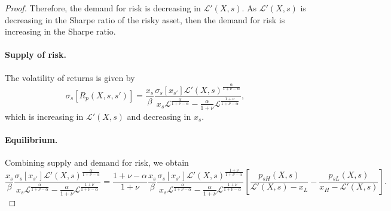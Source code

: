 \begin{proof}
Therefore, the demand for risk is decreasing in $\mathcal{L}'(X,s)$. 
As $\mathcal{L}'(X,s)$ is decreasing in the Sharpe ratio of the risky asset, then the demand for risk is increasing in the Sharpe ratio.

\paragraph{Supply of risk.} The volatility of returns is given by
\begin{equation}
    \sigma_s[R_p(X,s,s')] = \frac{x_s}{\beta} \frac{\sigma_s[x_{s'}] \mathcal{L}'(X,s)^\frac{\alpha}{1+\nu-\alpha}}{x_{s} \mathcal{L}^\frac{\alpha}{1+\nu-\alpha} - \frac{\alpha}{1+\nu} \mathcal{L}^{\frac{1+\nu}{1+\nu-\alpha}} },
\end{equation}
which is increasing in $\mathcal{L}'(X,s)$ and decreasing in $x_s$. 


\paragraph{Equilibrium.} Combining supply and demand for risk, we obtain\small
\begin{equation}
 \frac{x_s}{\beta} \frac{\sigma_s[x_{s'}] \mathcal{L}'(X,s)^\frac{\alpha}{1+\nu-\alpha}}{x_{s} \mathcal{L}^\frac{\alpha}{1+\nu-\alpha} - \frac{\alpha}{1+\nu} \mathcal{L}^{\frac{1+\nu}{1+\nu-\alpha}} } =  
 \frac{1+\nu-\alpha}{1+\nu}\frac{x_s}{\beta} \frac{\sigma_s[x_{s'}]\mathcal{L}'(X,s)^{\frac{1+\nu}{1+\nu-\alpha}}}{x_{s} \mathcal{L}^\frac{\alpha}{1+\nu-\alpha} - \frac{\alpha}{1+\nu} \mathcal{L}^{\frac{1+\nu}{1+\nu-\alpha}} } \left[\frac{p_{sH}(X,s) }{\mathcal{L}'(X,s) - x_L}  -\frac{p_{sL}(X,s)}{x_H-\mathcal{L}'(X,s)} \right].
\end{equation}\normalsize


\end{proof}
